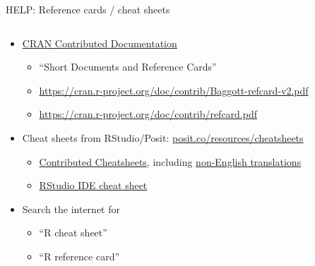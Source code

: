 \documentclass[
  11pt,
  ignorenonframetext,
]{beamer}
\providecommand{\tightlist}{%
  \setlength{\itemsep}{0pt}\setlength{\parskip}{0pt}}
\begin{document}
\begin{frame}{HELP: Reference cards / cheat sheets}
\protect\hypertarget{help-reference-cards-cheat-sheets}{}
\begin{columns}[c,onlytextwidth]
\begin{column}{0.55\textwidth}
\begin{itemize}
\item
  \href{https://cran.r-project.org/other-docs.html}{CRAN Contributed
  Documentation}

  \begin{itemize}
  \item
    ``Short Documents and Reference Cards''
  \item
    \url{https://cran.r-project.org/doc/contrib/Baggott-refcard-v2.pdf}
  \item
    \url{https://cran.r-project.org/doc/contrib/refcard.pdf}
  \end{itemize}
\item
  Cheat sheets from RStudio/Posit:
  \href{https://posit.co/resources/cheatsheets/}{posit.co/resources/cheatsheets}

  \begin{itemize}
  \tightlist
  \item
    \href{https://rstudio.github.io/cheatsheets/contributed-cheatsheets.html}{Contributed
    Cheatsheets}, including
    \href{https://posit.co/resources/cheatsheets/?type=translations/}{non-English
    translations}
  \item
    \href{https://raw.githubusercontent.com/rstudio/cheatsheets/main/rstudio-ide.pdf}{RStudio
    IDE cheat sheet}
  \end{itemize}
\item
  Search the internet for

  \begin{itemize}
  \tightlist
  \item
    ``R cheat sheet''
  \item
    ``R reference card''
  \end{itemize}
\end{itemize}
\end{column}


\end{columns}
\end{frame}
\end{document}
